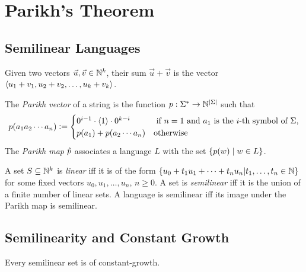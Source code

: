 \section{Parikh's Theorem}

\subsection{Semilinear Languages}

\begin{definition}
    Given two vectors $\vec{u}, \vec{v} \in \mathbb{N}^k$, their sum $\vec{u} + \vec{v}$ is the vector $\left \langle u_1 + v_1, u_2 +v_2, \ldots, u_k+v_k \right \rangle $.
\end{definition}

\begin{definition}
    The \emph{Parikh vector} of a string is the function $p: \Sigma^* \rightarrow \mathbb{N}^{| \Sigma |}$ such that
    \[
        p(a_1 a_2 \cdots a_n) \mathrel{\mathop:}=
            \begin{cases}
                0^{i-1} \cdot \left \langle 1 \right \rangle  \cdot 0^{k-i} & \text{ if $n = 1$ and $a_1$ is the $i$-th symbol of $\Sigma$,}\\
                p(a_1) + p(a_2 \cdots a_n) & \text{otherwise}
            \end{cases}
    \]
    The \emph{Parikh map} $\hat{p}$ associates a language $L$ with the set $\left \{  p(w) \mid w \in L \right \}$.
\end{definition}

\begin{definition}[Semilinearity]
    A set $S \subseteq \mathbb{N}^k$ is \emph{linear} iff it is of the form $\{u_0 + t_1 u_1 + \cdots + t_n u_n | t_1, \ldots, t_n \in \mathbb{N}\}$ for some fixed vectors $u_0, u_1, \ldots, u_n$, $n \geq 0$.
    A set is \emph{semilinear} iff it is the union of a finite number of linear sets.
    A language is semilinear iff its image under the Parikh map is semilinear.
\end{definition}

\subsection{Semilinearity and Constant Growth}

\begin{theorem}
    Every semilinear set is of constant-growth.
\end{theorem}

